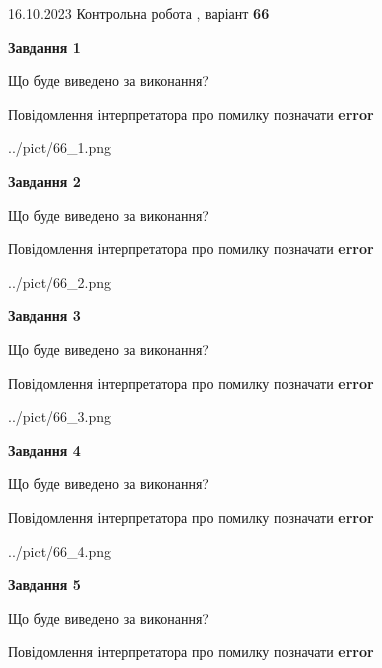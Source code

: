 \documentclass[12pt, ukrainian]{article}
\begin{document}
{\Large{16.10.2023 Контрольна робота , варіант  \No \textbf { 66 }\par}}
{
\begin {large}
{\begin {center}\textbf{Завдання 1}\end {center}}\par
Що буде виведено за виконання? \par
Повідомлення інтерпретатора про помилку позначати \textbf{error}

\begin{center}
	{../pict/66_1.png}
\end{center}
\newpage

{\begin {center}\textbf{Завдання 2}\end {center}}\par
Що буде виведено за виконання? \par
Повідомлення інтерпретатора про помилку позначати \textbf{error}

\begin{center}
	{../pict/66_2.png}
\end{center}
\newpage

{\begin {center}\textbf{Завдання 3}\end {center}}\par
Що буде виведено за виконання? \par
Повідомлення інтерпретатора про помилку позначати \textbf{error}

\begin{center}
	{../pict/66_3.png}
\end{center}
\newpage

{\begin {center}\textbf{Завдання 4}\end {center}}\par
Що буде виведено за виконання? \par
Повідомлення інтерпретатора про помилку позначати \textbf{error}

\begin{center}
	{../pict/66_4.png}
\end{center}
\newpage

{\begin {center}\textbf{Завдання 5}\end {center}}\par
Що буде виведено за виконання? \par
Повідомлення інтерпретатора про помилку позначати \textbf{error}


\end{large}}
\end{document}
